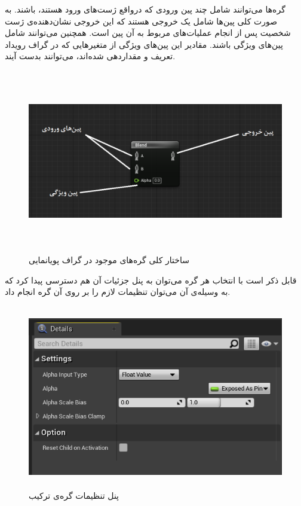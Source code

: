 گره‌‌ها می‌توانند شامل چند پین ورودی که درواقع ژست‌های ورود هستند، باشند.
به صورت کلی پین‌ها شامل یک خروجی هستند که این خروجی نشان‌دهنده‌ی 
ژست شخصیت پس از انجام عملیات‌های مربوط به آن پین است.
همچنین می‌توانند شامل پین‌های ویژگی باشند. مقادیر این پین‌های ویژگی از 
متغیر‌هایی که در گراف رویداد تعریف و مقداردهی شده‌اند، می‌توانند بدست آیند.

\begin{figure}[ht]
	\centerline{\includegraphics[width=\textwidth,height=8cm,keepaspectratio]{Figures/Ch3/AnimNodeStructure.png}}

	\caption{ساختار کلی گره‌های موجود در گراف پویانمایی}
	\label{fig:AnimNodeStructure}
\end{figure}

قابل ذکر است با انتخاب هر گره می‌توان به پنل جزئیات آن هم دسترسی پیدا کرد 
که به وسیله‌ی‌ آن می‌توان تنظیمات لازم را بر روی آن گره انجام داد.

\begin{figure}[ht]
	\centerline{\includegraphics[width=\textwidth,height=8cm,keepaspectratio]{Figures/Ch3/DetailsPanel.png}}

	\caption{پنل تنظیمات گره‌ی ترکیب}
	\label{fig:AnimNodeDetailPanel}
\end{figure}

